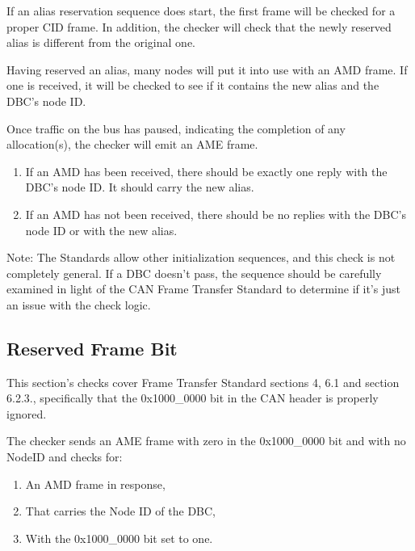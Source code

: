 If an alias reservation sequence does start, 
the first frame will be checked for a proper CID frame.  
In addition, the checker will check that the 
newly reserved alias is different from the original one.

Having reserved an alias, many nodes will put it into use with an AMD frame. 
If one is received, it will be checked to see if it contains the new alias
and the DBC's node ID.

Once traffic on the bus has paused, indicating the completion of 
any allocation(s), the checker will emit an AME frame.
\begin{enumerate}
\item If an AMD has been received, there should be exactly one
        reply with the DBC's node ID.  It should carry the new alias.
\item If an AMD has not been received, there should be no 
        replies with the DBC's node ID or with the new alias.
\end{enumerate}

Note: The Standards allow other initialization sequences, and this check
is not completely general.  If a DBC doesn't pass, the sequence should
be carefully examined in light of the CAN Frame Transfer Standard
to determine if it's just an issue with the check logic.
\subsection{Reserved Frame Bit}

This section's checks cover Frame Transfer Standard sections 4, 6.1 and section 6.2.3., 
specifically that the 0x1000\_0000 bit in the CAN header is properly
ignored.

The checker sends an AME frame with zero in the 0x1000\_0000 bit
and with no NodeID and checks for:
\begin{enumerate}
\item An AMD frame in response,
\item That carries the Node ID of the DBC,
\item With the 0x1000\_0000 bit set to one.
\end{enumerate}


  
